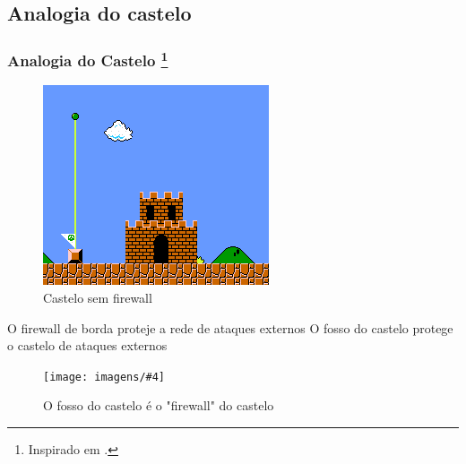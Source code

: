 





\subsection{Analogia do castelo}

\begin{frame}
	\frametitle{Analogia do Castelo \footnote{Inspirado em \cite{talal}.}}

	\begin{figure}
		\centering
		\includegraphics[height=.75\textheight]{imagens/castelo-mario.png}
		\caption{Castelo sem firewall}
	\end{figure}

\end{frame}

\newcommand{\analogia}[5][height=.5\textheight]{
	\begin{frame}
	\begin{block}{#2}
		#3
		\begin{figure}
			\centering
			\texttt{[image: imagens/\#4]}
			\caption{#5}
		\end{figure}
	\end{block}
	\end{frame}
}
\analogia	{O firewall de borda proteje a rede de ataques externos}
		{O fosso do castelo protege o castelo de ataques externos}
		{castelo.jpg}
		{O fosso do castelo é o "firewall" do castelo}

